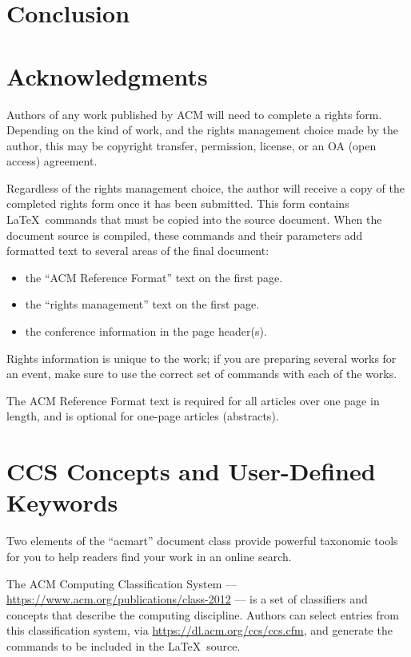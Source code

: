 \documentclass[sigconf,authordraft]{acmart}
\begin{document}
\section{Conclusion}

\section{Acknowledgments}

Authors of any work published by ACM will need to complete a rights
form. Depending on the kind of work, and the rights management choice
made by the author, this may be copyright transfer, permission,
license, or an OA (open access) agreement.

Regardless of the rights management choice, the author will receive a
copy of the completed rights form once it has been submitted. This
form contains \LaTeX\ commands that must be copied into the source
document. When the document source is compiled, these commands and
their parameters add formatted text to several areas of the final
document:
\begin{itemize}
\item the ``ACM Reference Format'' text on the first page.
\item the ``rights management'' text on the first page.
\item the conference information in the page header(s).
\end{itemize}

Rights information is unique to the work; if you are preparing several
works for an event, make sure to use the correct set of commands with
each of the works.

The ACM Reference Format text is required for all articles over one
page in length, and is optional for one-page articles (abstracts).

\section{CCS Concepts and User-Defined Keywords}

Two elements of the ``acmart'' document class provide powerful
taxonomic tools for you to help readers find your work in an online
search.

The ACM Computing Classification System ---
\url{https://www.acm.org/publications/class-2012} --- is a set of
classifiers and concepts that describe the computing
discipline. Authors can select entries from this classification
system, via \url{https://dl.acm.org/ccs/ccs.cfm}, and generate the
commands to be included in the \LaTeX\ source.
\end{document}
